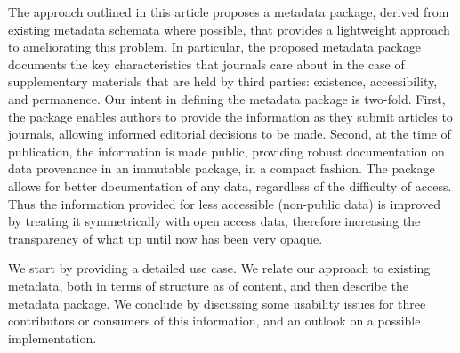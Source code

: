 The approach outlined in this article proposes a metadata package, derived from existing metadata schemata where possible, that provides a lightweight approach to ameliorating this problem. In particular, the proposed metadata package documents the key characteristics that journals care about in the case of supplementary materials that are held by third parties: existence, accessibility, and permanence. Our intent in defining the metadata package is two-fold. First, the package enables  authors to provide the information as they submit articles to journals, allowing informed editorial decisions to be made. Second, at the time of publication, the information is made public, providing robust documentation on data provenance in an immutable package, in a compact fashion.  The package allows for better documentation of any data, regardless of the difficulty of access.   Thus the information provided for less accessible (non-public data) is improved by treating it symmetrically with open access data, therefore increasing the transparency of what up until now has been very opaque.

We start by providing a detailed use case. We relate our approach to existing metadata, both in terms of structure as of content, and then describe the metadata package. We conclude by discussing some usability issues for three contributors or consumers of this information, and an outlook on a possible implementation.